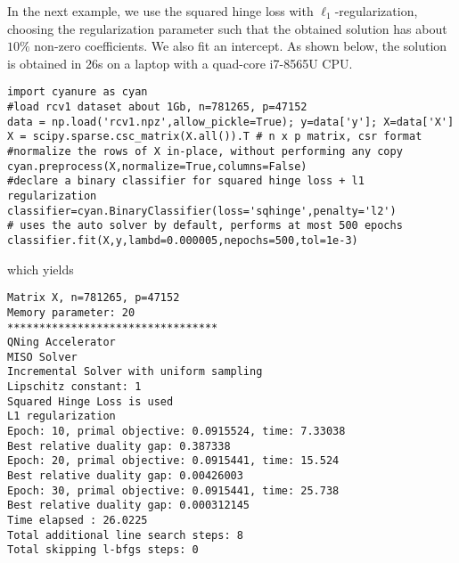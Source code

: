 \documentclass{article}
\begin{document}
In the next example, we use the squared hinge loss with
$\ell_1$-regularization, choosing the regularization parameter such that the
obtained solution has about $10\%$ non-zero coefficients.
We also fit an intercept. As shown below, the solution is obtained in 26s on a
laptop with a quad-core i7-8565U CPU.
\begin{verbatim}
import cyanure as cyan
#load rcv1 dataset about 1Gb, n=781265, p=47152
data = np.load('rcv1.npz',allow_pickle=True); y=data['y']; X=data['X']
X = scipy.sparse.csc_matrix(X.all()).T # n x p matrix, csr format 
#normalize the rows of X in-place, without performing any copy
cyan.preprocess(X,normalize=True,columns=False) 
#declare a binary classifier for squared hinge loss + l1 regularization
classifier=cyan.BinaryClassifier(loss='sqhinge',penalty='l2')
# uses the auto solver by default, performs at most 500 epochs
classifier.fit(X,y,lambd=0.000005,nepochs=500,tol=1e-3) 
\end{verbatim}
which yields
\begin{verbatim}
Matrix X, n=781265, p=47152
Memory parameter: 20
*********************************
QNing Accelerator
MISO Solver
Incremental Solver with uniform sampling
Lipschitz constant: 1
Squared Hinge Loss is used
L1 regularization
Epoch: 10, primal objective: 0.0915524, time: 7.33038
Best relative duality gap: 0.387338
Epoch: 20, primal objective: 0.0915441, time: 15.524
Best relative duality gap: 0.00426003
Epoch: 30, primal objective: 0.0915441, time: 25.738
Best relative duality gap: 0.000312145
Time elapsed : 26.0225
Total additional line search steps: 8
Total skipping l-bfgs steps: 0
\end{verbatim}
\end{document}
